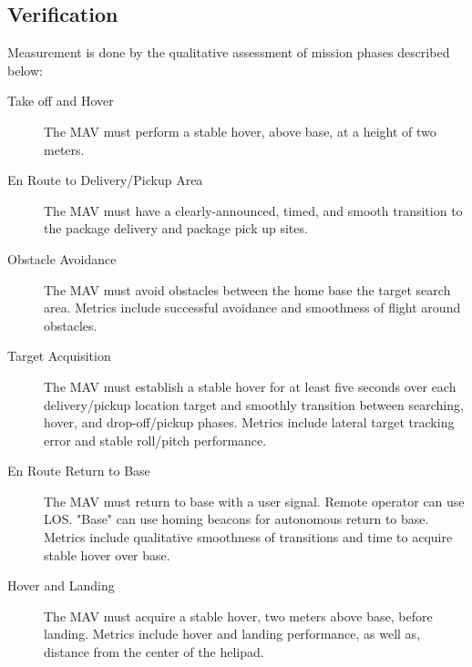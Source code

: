 \documentclass[onecolumn, oneside, letterpaper, draftclsnofoot, 10pt, compsoc]{IEEEtran}
\begin{document}
\subsection{Verification}
Measurement is done by the qualitative assessment of mission phases described below:
\begin{description}
\item[Take off and Hover] The MAV must perform a stable hover, above base, at a height of two meters.
\item[En Route to Delivery/Pickup Area] The MAV must have a clearly-announced, timed, and smooth transition to the package delivery and package pick up sites.
\item[Obstacle Avoidance]The MAV must avoid obstacles between the home base the target search area. Metrics include successful avoidance and smoothness of flight around obstacles.
\item[Target Acquisition] The MAV must establish a stable hover for at least five seconds over each delivery/pickup location target and smoothly transition between searching, hover, and drop-off/pickup phases. Metrics include lateral target tracking error and stable roll/pitch performance.
\item[En Route Return to Base] The MAV must return to base with a user signal. Remote operator can use LOS. "Base" can use homing beacons for autonomous return to base. Metrics include qualitative smoothness of transitions and time to acquire stable hover over base.
\item[Hover and Landing] The MAV must acquire a stable hover, two meters above base, before landing. Metrics include hover and landing performance, as well as, distance from the center of the helipad.
\end{description}
\end{document}
